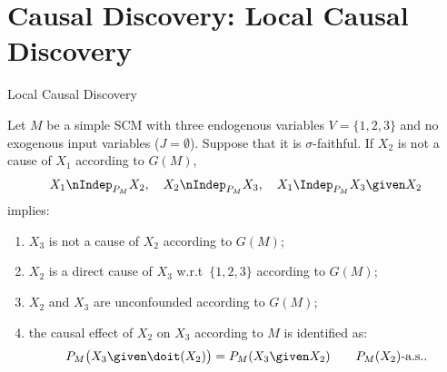 \part{Causal Discovery: Local Causal Discovery}
\frame{\partpage}

\begin{frame}{Local Causal Discovery \cite{Cooper1997}}
\begin{Prp}[\ref{prp:LCD}]
  Let $M$ be a simple SCM with three endogenous variables $V = \{1,2,3\}$ and no exogenous input variables ($J = \emptyset$).
  Suppose that it is $\sigma$-faithful. 
  If $X_2$ is not a cause of $X_1$ according to $G(M)$,
  $$X_1 \nIndep_{P_M} X_2, \quad X_2 \nIndep_{P_M} X_3, \quad X_1 \Indep_{P_M} X_3 \given X_2$$
  implies:
  \begin{enumerate}
  \item $X_3$ is not a cause of $X_2$ according to $G(M)$;
  \item $X_2$ is a direct cause of $X_3$ w.r.t\ $\{1,2,3\}$ according to $G(M)$;
  \item $X_2$ and $X_3$ are unconfounded according to $G(M)$;
  \item the causal effect of $X_2$ on $X_3$ according to $M$ is identified as:
    \begin{equation}\label{sl-eq:LCD}
      P_{M}\big(X_3 \given \doit(X_2)\big) = P_{M}(X_3 \given X_2) \qquad P_M(X_2)\text{-a.s.}.
    \end{equation}
  \end{enumerate}
\end{Prp}
\end{frame}

